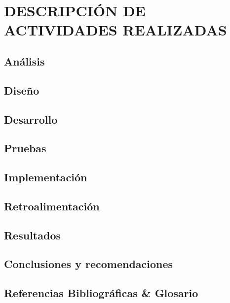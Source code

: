 \documentclass[12pt]{book} %
\begin{document}
\chapter{DESCRIPCIÓN DE ACTIVIDADES REALIZADAS}
\thispagestyle{empty}
\newpage
\section{Análisis}

\section{Diseño}

\section{Desarrollo}

\section{Pruebas}

\section{Implementación}

\section{Retroalimentación}

\section{Resultados}

\section{Conclusiones y recomendaciones}

\section{Referencias Bibliográficas \& Glosario} 	
\newpage


\printnoidxglossaries
{}
\end{document}
